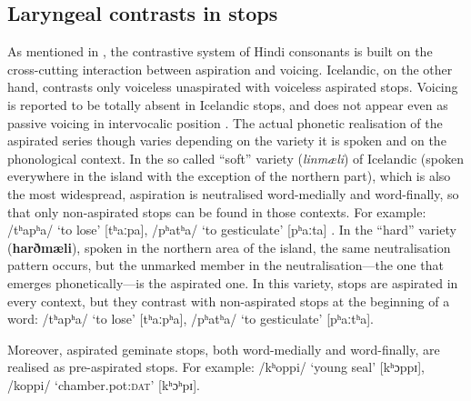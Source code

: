 \documentclass[11pt,a4paper,openany]{memoir}\usepackage[]{graphicx}\usepackage[]{color}
\begin{document}

\subsection{Laryngeal contrasts in stops}
As mentioned in , the contrastive system of Hindi consonants is built on the cross-cutting interaction between aspiration and voicing.
Icelandic, on the other hand, contrasts only voiceless unaspirated with voiceless aspirated stops.
Voicing is reported to be totally absent in Icelandic stops, and does not appear even as passive voicing in intervocalic position \citep{arnason2011}.
The actual phonetic realisation of the aspirated series though varies depending on the variety it is spoken and on the phonological context.
In the so called ``soft'' variety (\textit{linmæli}) of Icelandic (spoken everywhere in the island with the exception of the northern part), which is also the most widespread, aspiration is neutralised word-medially and word-finally, so that only non-aspirated stops can be found in those contexts.
For example: /tʰapʰa/ `to lose' [tʰaːpa], /pʰatʰa/ `to gesticulate' [pʰaːta] \citep[104]{arnason2011}.
In the ``hard'' variety (\textbf{harðmæli}), spoken in the northern area of the island, the same neutralisation pattern occurs, but the unmarked member in the neutralisation---the one that emerges phonetically---is the aspirated one.
In this variety, stops are aspirated in every context, but they contrast with non-aspirated stops at the beginning of a word: /tʰapʰa/ `to lose' [tʰaːpʰa], /pʰatʰa/ `to gesticulate' [pʰaːtʰa].

Moreover, aspirated geminate stops, both word-medially and word-finally, are realised as pre-aspirated stops.
For example: /kʰoppi/ `young seal' [kʰɔppɪ], /koppi/ `chamber.pot:\textsc{dat}' [kʰɔʰpɪ].
\end{document}
